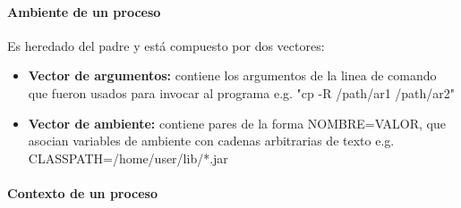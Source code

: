 \documentclass[spanish]{article}
\begin{document}
\paragraph{Ambiente de un proceso}

Es heredado del padre y est\'{a} compuesto por dos vectores:
\begin{itemize}
  \item \textbf{Vector de argumentos: } contiene los argumentos de la linea de comando que fueron usados para invocar al programa e.g. "cp -R /path/ar1 /path/ar2"
  \item \textbf{Vector de ambiente: } contiene pares de la forma NOMBRE=VALOR, que asocian variables de ambiente con cadenas arbitrarias de texto e.g. CLASSPATH=/home/user/lib/*.jar
\end{itemize}

\paragraph{Contexto de un proceso}
\end{document}
